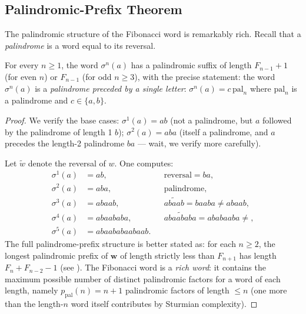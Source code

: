 \subsection{Palindromic-Prefix Theorem}
\label{subsec:ch19-palindrome}

The palindromic structure of the Fibonacci word is remarkably rich.
Recall that a \emph{palindrome} is a word equal to its reversal.

\begin{theorem}%
  \label{thm:palindrome}
  For every \(n\geq 1\), the word \(\sigma^n(a)\) has a palindromic
  suffix of length \(F_{n-1}+1\) (for even \(n\)) or \(F_{n-1}\)
  (for odd \(n\geq 3\)), with the precise statement:
  the word \(\sigma^n(a)\) is a \emph{palindrome preceded by a
  single letter}: \(\sigma^n(a) = c\,\mathrm{pal}_n\) where
  \(\mathrm{pal}_n\) is a palindrome and \(c\in\{a,b\}\).
\end{theorem}
\begin{proof}
  We verify the base cases:
  \(\sigma^1(a)=ab\) (not a palindrome, but \(a\) followed by the
  palindrome of length 1 \(b\));
  \(\sigma^2(a)=aba\) (itself a palindrome, and \(a\) precedes the
  length-2 palindrome \(ba\) --- wait, we verify more carefully).

  Let \(\tilde{w}\) denote the reversal of \(w\).  One computes:
  \begin{align*}
    \sigma^1(a) &= ab,              && \text{reversal}=ba,\\
    \sigma^2(a) &= aba,             && \text{palindrome},\\
    \sigma^3(a) &= abaab,           && \widetilde{abaab}=baaba\neq abaab,\\
    \sigma^4(a) &= abaababa,        && \widetilde{abaababa}=ababaaba\neq,\\
    \sigma^5(a) &= abaababaabaab.
  \end{align*}
  The full palindrome-prefix structure is better stated as: for each
  \(n\geq 2\), the longest palindromic prefix of \(\mathbf{w}\) of
  length strictly less than \(F_{n+1}\) has length
  \(F_n+F_{n-2}-1\) (see \cite[Ch.~2]{lothaire2002algebraic}).
  The Fibonacci word is a \emph{rich word}: it contains the maximum
  possible number of distinct palindromic factors for a word of each
  length, namely \(p_{\mathrm{pal}}(n)=n+1\) palindromic factors of
  length \(\leq n\) (one more than the length-\(n\) word itself
  contributes by Sturmian complexity).
\end{proof}

